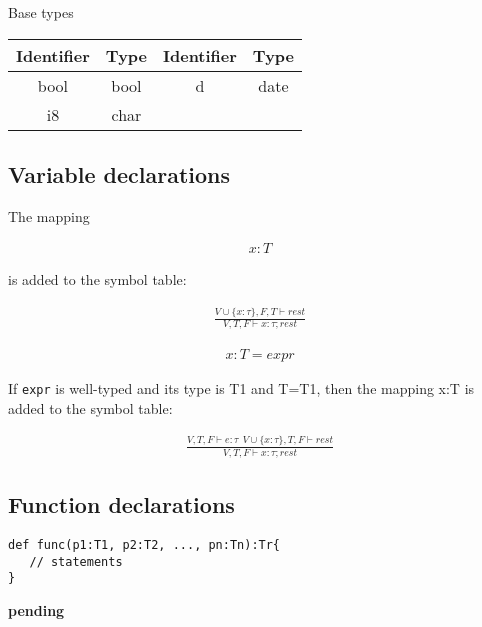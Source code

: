 
Base types

\begin{table}[ht!]
\centering
\begin{tabular}{cc|cc}
\hline
Identifier & Type & Identifier & Type \\ \hline
bool & bool & d & date \\
i8 & char & & \\
\hline
\end{tabular}

\end{table}

\subsection{Variable declarations}
The mapping

\begin{align*}
x:T
\end{align*}

is added to the symbol table:

\begin{align}
\frac{V\cup \{x:\tau\},F,T\vdash rest}{V,T,F\vdash x:\tau;rest}
\end{align}


\begin{align*}
x:T = expr
\end{align*}

If \texttt{expr} is well-typed and its type is T1 and T=T1, then the mapping x:T is added to the symbol table:

\begin{align}
\frac
{V,T,F\vdash e:\tau\ \ V\cup\{x:\tau\},T,F\vdash rest}
{V,T,F\vdash x:\tau; rest}
\end{align}

\subsection{Function declarations}

\begin{verbatim}
def func(p1:T1, p2:T2, ..., pn:Tn):Tr{
   // statements
}
\end{verbatim}

\textbf{pending}
